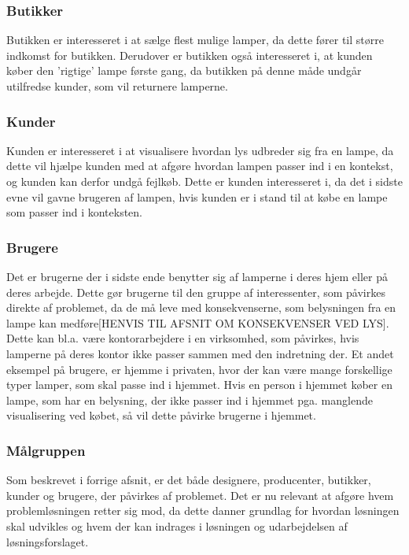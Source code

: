 \subsubsection{Butikker}
Butikken er interesseret i at sælge flest mulige lamper, da dette fører til større indkomst for butikken. Derudover er butikken også interesseret i, at kunden køber den 'rigtige' lampe første gang, da butikken på denne måde undgår utilfredse kunder, som vil returnere lamperne.

\subsubsection{Kunder}
Kunden er interesseret i at visualisere hvordan lys udbreder sig fra en lampe, da dette vil hjælpe kunden med at afgøre hvordan lampen passer ind i en kontekst, og kunden kan derfor undgå fejlkøb. Dette er kunden interesseret i, da det i sidste evne vil gavne brugeren af lampen, hvis kunden er i stand til at købe en lampe som passer ind i konteksten.

\subsubsection{Brugere}
Det er brugerne der i sidste ende benytter sig af lamperne i deres hjem eller på deres arbejde. Dette gør brugerne til den gruppe af interessenter, som påvirkes direkte af problemet, da de må leve med konsekvenserne, som belysningen fra en lampe kan medføre[HENVIS TIL AFSNIT OM KONSEKVENSER VED LYS]. Dette kan bl.a. være kontorarbejdere i en virksomhed, som påvirkes, hvis lamperne på deres kontor ikke passer sammen med den indretning der. Et andet eksempel på brugere, er hjemme i privaten, hvor der kan være mange forskellige typer lamper, som skal passe ind i hjemmet. Hvis en person i hjemmet køber en lampe, som har en belysning, der ikke passer ind i hjemmet pga. manglende visualisering ved købet, så vil dette påvirke brugerne i hjemmet. 

\subsubsection{Målgruppen}
Som beskrevet i forrige afsnit, er det både designere, producenter, butikker, kunder og brugere, der påvirkes af problemet. Det er nu relevant at afgøre hvem problemløsningen retter sig mod, da dette danner grundlag for hvordan løsningen skal udvikles og hvem der kan indrages i løsningen og udarbejdelsen af løsningsforslaget. 

